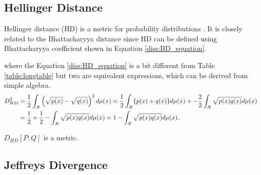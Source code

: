 \documentclass[11pt]{article}
\begin{document}
\begin{center}
\end{center}

\subsection{Hellinger Distance}\label{diss:HD}

Hellinger distance (HD) is a metric for probability distributions \citep{hellinger_neue_1909-1}. It is closely related to the Bhattacharyya distance since HD can be defined using Bhattacharyya coefficient shown in Equation \eqref{diss:BD_equation}.


\begin{center}
\end{center}


where the Equation \eqref{diss:HD_equation} is a bit different from Table \ref{table:longtable} but two are equivalent expressions, which can be derived from simple algebra.
\begin{align*}
D_{HD}^2 &= \frac{1}{2} \int_{\cal{X}} \left( \sqrt{p(x)} - \sqrt{q(x)} \right)^2 d\mu(x) = \frac{1}{2} \int_{\cal{X}} \lbrace p(x) + q(x) \rbrace d\mu(x) + - \frac{2}{2} \int_{\cal{X}} \sqrt{p(x)q(x)} d\mu(x)\\
&= \frac{1}{2} + \frac{1}{2} - \int_{\cal{X}} \sqrt{p(x)q(x)} d\mu(x) = 1 - \int_{\cal{X}} \sqrt{p(x)q(x)} d\mu(x).
\end{align*}




\begin{Properties}
	\item $D_{HD}[P:Q]$ is a metric. 
\end{Properties}


\subsection{Jeffreys Divergence}\label{diss:JD}
\end{document}
